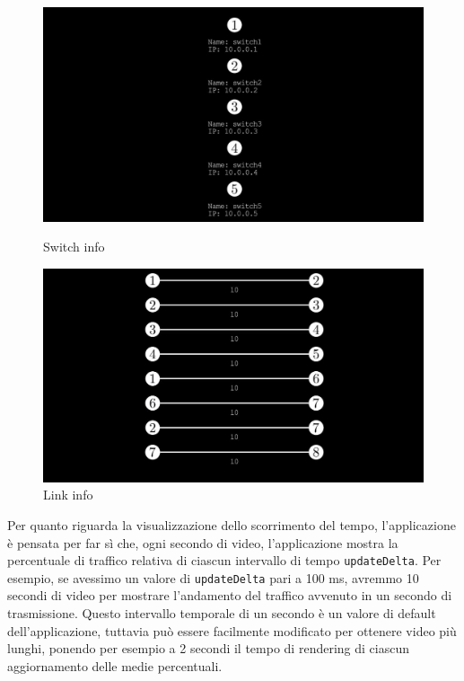 \documentclass[binding=0.6cm]{sapthesis}
\begin{document}
\begin{figure}[ht]
    \centering
    \begin{minipage}{0.48\textwidth}
      \includegraphics[width=\linewidth]{immagini/switch_info.JPG}
      \caption{Switch info}
      \label{fig:switch_info}
    \end{minipage}\hfill
    \begin{minipage}{0.48\textwidth}
      \includegraphics[width=\linewidth]{immagini/links_info.JPG}
      \caption{Link info}
      \label{fig:links_info}
    \end{minipage}
\end{figure}

Per quanto riguarda la visualizzazione dello scorrimento del tempo, l'applicazione è pensata per far sì che, ogni secondo di video, 
l'applicazione mostra la percentuale di traffico relativa di ciascun
intervallo di tempo \texttt{updateDelta}. Per esempio, se avessimo un valore di \texttt{updateDelta} pari a 100 ms, avremmo 10 secondi di video per mostrare
l'andamento del traffico avvenuto in un secondo di trasmissione. Questo intervallo temporale di un secondo è un valore di default dell'applicazione, tuttavia
può essere facilmente modificato per ottenere video più lunghi, ponendo per esempio a 2 secondi il tempo di rendering di ciascun aggiornamento delle medie percentuali.
\end{document}
